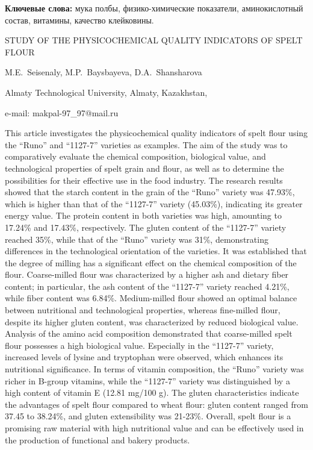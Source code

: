 {\bfseries Ключевые слова:} мука полбы, физико-химические показатели,
аминокислотный состав, витамины, качество клейковины.

\begin{header}
STUDY OF THE PHYSICOCHEMICAL QUALITY INDICATORS OF SPELT FLOUR

M.E.~Seisenaly\envelope,
M.P.~Baysbayeva,
D.A.~Shansharova
\end{header}

\begin{affil}
Almaty Technological University, Almaty, Kazakhstan,

e-mail: makpal-97\_97@mail.ru
\end{affil}

This article investigates the physicochemical quality indicators of
spelt flour using the ``Runo'' and ``1127-7'' varieties as examples. The
aim of the study was to comparatively evaluate the chemical composi\-tion,
biological value, and technological properties of spelt grain and flour,
as well as to determine the possibilities for their effective use in the
food industry. The research results showed that the starch content in
the grain of the ``Runo'' variety was 47.93\%, which is higher than that
of the ``1127-7'' variety (45.03\%), indicating its greater energy
value. The protein content in both varieties was high, amounting to
17.24\% and 17.43\%, respectively. The gluten content of the ``1127-7''
variety reached 35\%, while that of the ``Runo'' variety was 31\%,
demonstrating differences in the technological orientation of the
varieties. It was established that the degree of milling has a
significant effect on the chemical composition of the flour.
Coarse-milled flour was characterized by a higher ash and dietary fiber
content; in particular, the ash content of the ``1127-7'' variety
reached 4.21\%, while fiber content was 6.84\%. Medium-milled flour
showed an optimal balance between nutritional and technological
properties, whereas fine-milled flour, despite its higher gluten
content, was characterized by reduced biological value. Analysis of the
amino acid composition demonstrated that coarse-milled spelt flour
possesses a high biological value. Especially in the ``1127-7'' variety,
increased levels of lysine and tryptophan were observed, which enhances
its nutritional significance. In terms of vitamin composition, the
``Runo'' variety was richer in B-group vitamins, while the ``1127-7''
variety was distinguished by a high content of vitamin E (12.81 mg/100
g). The gluten characteristics indicate the advantages of spelt flour
compared to wheat flour: gluten content ranged from 37.45 to 38.24\%,
and gluten extensibility was 21-23\%. Overall, spelt flour is a
promising raw material with high nutritional value and can be
effectively used in the production of functional and bakery products.


